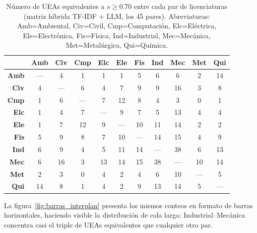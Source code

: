 \documentclass[11pt,a4paper]{article}
\begin{document}
\begin{table}[H]
\centering
\caption{Número de UEAs equivalentes a $s \geq 0.70$ entre cada par de licenciaturas
  (matriz híbrida TF-IDF + LLM, los 45 pares).
  Abreviaturas: Amb=Ambiental, Civ=Civil, Cmp=Computación, Elc=Eléctrica,
  Ele=Electrónica, Fis=Física, Ind=Industrial, Mec=Mecánica,
  Met=Metalúrgica, Qui=Química.}
\label{tab:matriz_interplan}
\footnotesize\setlength{\tabcolsep}{4pt}
\begin{tabular}{r *{10}{c}}
\toprule
 & \textbf{Amb} & \textbf{Civ} & \textbf{Cmp} & \textbf{Elc} & \textbf{Ele} & \textbf{Fis} & \textbf{Ind} & \textbf{Mec} & \textbf{Met} & \textbf{Qui} \\
\midrule
\textbf{Amb} & --- &  4 &  1 &  1 &  1 &  5 &  6 &  6 &  2 & 14 \\
\textbf{Civ} &  4  & --- &  6 &  4 &  7 &  9 &  9 & 16 &  3 &  8 \\
\textbf{Cmp} &  1  &  6  & --- &  7 & 12 &  8 &  4 &  3 &  0 &  1 \\
\textbf{Elc} &  1  &  4  &  7  & --- &  9 &  7 &  5 & 13 &  4 &  4 \\
\textbf{Ele} &  1  &  7  & 12  &  9  & --- & 10 & 11 & 14 &  2 &  2 \\
\textbf{Fis} &  5  &  9  &  8  &  7  & 10  & --- & 14 & 15 &  4 &  9 \\
\textbf{Ind} &  6  &  9  &  4  &  5  & 11  & 14  & --- & 38 &  6 & 13 \\
\textbf{Mec} &  6  & 16  &  3  & 13  & 14  & 15  & 38  & --- & 10 & 14 \\
\textbf{Met} &  2  &  3  &  0  &  4  &  2  &  4  &  6  & 10  & --- &  5 \\
\textbf{Qui} & 14  &  8  &  1  &  4  &  2  &  9  & 13  & 14  &  5  & --- \\
\bottomrule
\end{tabular}
\end{table}

La figura~\ref{fig:barras_interplan} presenta los mismos conteos en formato de barras horizontales, haciendo visible la distribución de cola larga: Industrial--Mecánica concentra casi el triple de UEAs equivalentes que cualquier otro par.
\end{document}
